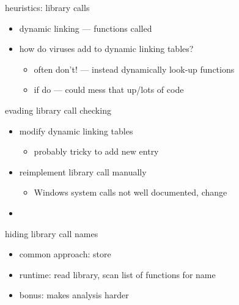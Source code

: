 \begin{frame}{heuristics: library calls}
    \begin{itemize}
    \item dynamic linking --- functions called 
    \item how do viruses add to dynamic linking tables?
        \begin{itemize}
        \item often don't! --- instead dynamically look-up functions
        \item if do --- could mess that up/lots of code
        \end{itemize}
    \end{itemize}

\end{frame}

\begin{frame}{evading library call checking}
    \begin{itemize}
    \item modify dynamic linking tables
        \begin{itemize}
        \item probably tricky to add new entry
        \end{itemize}
    \item reimplement library call manually
        \begin{itemize}
        \item Windows system calls not well documented, change
        \end{itemize}
    \item {}
    \end{itemize}
\end{frame}

\begin{frame}{hiding library call names}
    \begin{itemize}
    \item common approach: store 
    \item runtime: read library, scan list of functions for name
    \vspace{.5cm}
    \item bonus: makes analysis harder
    \end{itemize}
\end{frame}


